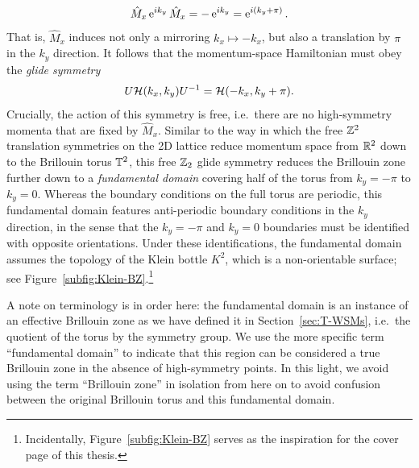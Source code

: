 \begin{equation*}
	\hat{M}_x\operatorname{e}^{ik_y}\hat{M}_x = -\operatorname{e}^{ik_y} = \operatorname{e}^{i(k_y+\pi)}.
\end{equation*}
That is, $\hat{M}_x$ induces not only a mirroring $k_x\mapsto-k_x$, but also a translation by $\pi$ in the $k_y$ direction. It follows that the momentum-space Hamiltonian must obey the \emph{glide symmetry}
\begin{equation}\label{eq:2D_glide}
	U\mathcal{H}(k_x, k_y)U^{-1} = \mathcal{H}(-k_x, k_y + \pi).
\end{equation}
Crucially, the action of this symmetry is free, i.e.\ there are no high-symmetry momenta that are fixed by $\hat{M}_x$. Similar to the way in which the free $\mathbb{Z}^2$ translation symmetries on the 2D lattice reduce momentum space from $\mathbb{R}^2$ down to the Brillouin torus $\mathbb{T}^2$, this free $\mathbb{Z}_2$ glide symmetry reduces the Brillouin zone further down to a \emph{fundamental domain} covering half of the torus from $k_y=-\pi$ to $k_y=0$. Whereas the boundary conditions on the full torus are periodic, this fundamental domain features anti-periodic boundary conditions in the $k_y$ direction, in the sense that the $k_y=-\pi$ and $k_y=0$ boundaries must be identified with opposite orientations. Under these identifications, the fundamental domain assumes the topology of the Klein bottle $K^2$, which is a non-orientable surface; see Figure~\ref{subfig:Klein-BZ}.\footnote{
	Incidentally, Figure~\ref{subfig:Klein-BZ} serves as the inspiration for the cover page of this thesis.}

A note on terminology is in order here: the fundamental domain is an instance of an effective Brillouin zone as we have defined it in Section~\ref{sec:T-WSMs}, i.e.\ the quotient of the torus by the symmetry group. We use the more specific term ``fundamental domain'' to indicate that this region can be considered a true Brillouin zone in the absence of high-symmetry points. In this light, we avoid using the term ``Brillouin zone'' in isolation from here on to avoid confusion between the original Brillouin torus and this fundamental domain.

